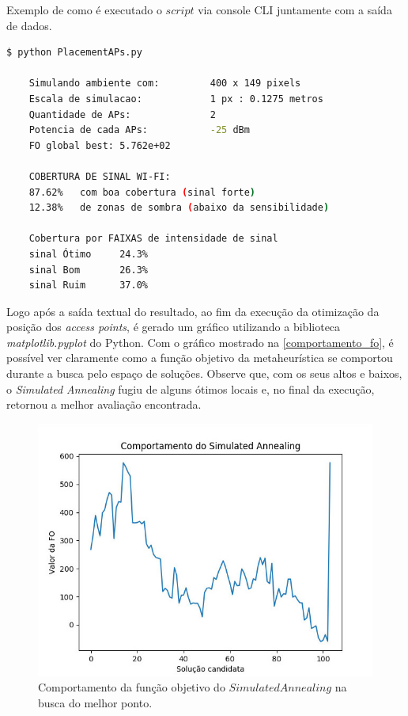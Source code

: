 \documentclass[
	12pt,				%
	twoside,			%
	a4paper,			%
	english,			%
	french,				%
	spanish,			%
	brazil				%
	]{abntex2}
\begin{document}
\begin{quadro}[!htb]
    \caption{\label{saida_exemplo} Exemplo de como é executado o $script$ via console CLI juntamente com a saída de dados. }

    \begin{lstlisting}[language=bash]
    $ python PlacementAPs.py 

    Simulando ambiente com:         400 x 149 pixels
    Escala de simulacao:            1 px : 0.1275 metros
    Quantidade de APs:              2
    Potencia de cada APs:           -25 dBm
    FO global best: 5.762e+02

    COBERTURA DE SINAL WI-FI:
    87.62%   com boa cobertura (sinal forte)
    12.38%   de zonas de sombra (abaixo da sensibilidade)

    Cobertura por FAIXAS de intensidade de sinal
    sinal Ótimo     24.3%
    sinal Bom       26.3%
    sinal Ruim      37.0%
    \end{lstlisting}

\end{quadro}

Logo após a saída textual do resultado, ao fim da execução da otimização
da posição dos \emph{access points}, é gerado um gráfico utilizando a
biblioteca \emph{matplotlib.pyplot} do Python. Com o gráfico mostrado na
\autoref{comportamento_fo}, é possível ver claramente como a função
objetivo da metaheurística se comportou durante a busca pelo espaço de
soluções. Observe que, com os seus altos e baixos, o \emph{Simulated
Annealing} fugiu de alguns ótimos locais e, no final da execução,
retornou a melhor avaliação encontrada.

\begin{figure}[!ht]
    \caption{\label{comportamento_fo} Comportamento da função objetivo do $Simulated Annealing$ na busca do melhor ponto.}
    \begin{center}
        \includegraphics[scale=0.5]{imagens/comportamento-fo.jpg}
    \end{center}
\end{figure}
\end{document}

